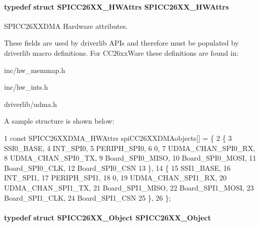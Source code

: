 \paragraph[{S\+P\+I\+C\+C26\+X\+X\+\_\+\+H\+W\+Attrs}]{\setlength{\rightskip}{0pt plus 5cm}typedef struct {\bf S\+P\+I\+C\+C26\+X\+X\+\_\+\+H\+W\+Attrs}  {\bf S\+P\+I\+C\+C26\+X\+X\+\_\+\+H\+W\+Attrs}}\label{_s_p_i_c_c26_x_x_d_m_a_8h_a21a908cc990ffbb1378d92a68c09ac2a}


S\+P\+I\+C\+C26\+X\+X\+D\+M\+A Hardware attributes. 

These fields are used by driverlib A\+P\+Is and therefore must be populated by driverlib macro definitions. For C\+C26xx\+Ware these definitions are found in\+:
\begin{DoxyItemize}
\item inc/hw\+\_\+memmap.\+h
\item inc/hw\+\_\+ints.\+h
\item driverlib/udma.\+h
\end{DoxyItemize}

A sample structure is shown below\+: 
\begin{DoxyCode}
1 const SPICC26XXDMA\_HWAttrs spiCC26XXDMAobjects[] = \{
2     \{
3         SSI0\_BASE,
4         INT\_SPI0,
5         PERIPH\_SPI0,
6         0,
7         UDMA\_CHAN\_SPI0\_RX,
8         UDMA\_CHAN\_SPI0\_TX,
9         Board\_SPI0\_MISO,
10         Board\_SPI0\_MOSI,
11         Board\_SPI0\_CLK,
12         Board\_SPI0\_CSN
13     \},
14     \{
15         SSI1\_BASE,
16         INT\_SPI1,
17         PERIPH\_SPI1,
18         0,
19         UDMA\_CHAN\_SPI1\_RX,
20         UDMA\_CHAN\_SPI1\_TX,
21         Board\_SPI1\_MISO,
22         Board\_SPI1\_MOSI,
23         Board\_SPI1\_CLK,
24         Board\_SPI1\_CSN
25     \},
26 \};
\end{DoxyCode}
\paragraph[{S\+P\+I\+C\+C26\+X\+X\+\_\+\+Object}]{\setlength{\rightskip}{0pt plus 5cm}typedef struct {\bf S\+P\+I\+C\+C26\+X\+X\+\_\+\+Object}  {\bf S\+P\+I\+C\+C26\+X\+X\+\_\+\+Object}}\label{_s_p_i_c_c26_x_x_d_m_a_8h_a4e4c18a99d7f9d331ed9d2f21975e8c2}


